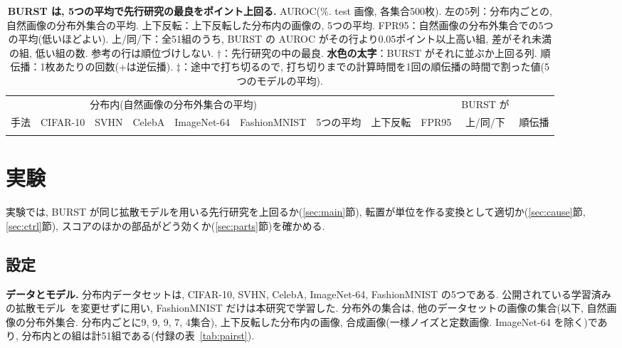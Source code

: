 \documentclass[MIRU,submit]{miru2025j}
\makeatletter
\newcommand{\method}{BURST}                 %
\renewenvironment{table*}{\@floatenv\capwidth\textwidth\ecapwidth\textwidth\abovecaptionskip\z@\belowcaptionskip1mm\@dblfloat{table}}{\end@dblfloat}
\makeatother
\begin{document}
\begin{table}[t]\centering\scriptsize\setlength{\tabcolsep}{3.2pt}\renewcommand{\arraystretch}{0.9}
\caption{\textbf{\method{} は, 5つの平均で先行研究の最良を\nGapPriorT{}ポイント上回る.} AUROC(\%. test 画像, 各集合500枚). 左の5列：分布内ごとの, 自然画像の分布外集合の平均. 上下反転：上下反転した分布内の画像の, 5つの平均. FPR95：自然画像の分布外集合での5つの平均(低いほどよい). 上/同/下：全51組のうち, \method{} の AUROC がその行より0.05ポイント以上高い組, 差がそれ未満の組, 低い組の数. 参考の行は順位づけしない. $\dagger$：先行研究の中の最良. \protect\colorbox{firstblue}{\textbf{水色の太字}}：\method{} がそれに並ぶか上回る列. 順伝播：1枚あたりの回数(+は逆伝播). $\ddagger$：途中で打ち切るので, 打ち切りまでの計算時間を1回の順伝播の時間で割った値(5つのモデルの平均).}
\label{tab:main}
\begin{adjustbox}{max width=\textwidth}\begin{tabular}{@{}lcccccccccc@{}}\toprule
& \multicolumn{5}{c}{分布内(自然画像の分布外集合の平均)} & & & & \method{} が & \\\cmidrule(lr){2-6}
手法 & CIFAR-10 & SVHN & CelebA & ImageNet-64 & FashionMNIST & 5つの平均 & 上下反転 & FPR95 & 上/同/下 & 順伝播\\\midrule
{}{tab_main.tex}
\end{tabular}\end{adjustbox}
\end{table}

\section{実験}
\label{sec:exp}
実験では, \method{} が同じ拡散モデルを用いる先行研究を上回るか(\ref{sec:main}節), 転置が単位を作る変換として適切か(\ref{sec:cause}節, \ref{sec:ctrl}節), スコアのほかの部品がどう効くか(\ref{sec:parts}節)を確かめる.

\subsection{設定}
\textbf{データとモデル.} 分布内データセットは, CIFAR-10, SVHN, CelebA, ImageNet-64, FashionMNIST の5つである. 公開されている学習済みの拡散モデル~\cite{karras2022edm,kamkari2024geometric,nichol2021improved,karras2024edm2}を変更せずに用い, FashionMNIST だけは本研究で学習した. 分布外の集合は, 他のデータセットの画像の集合(以下, 自然画像の分布外集合. 分布内ごとに9, 9, 9, 7, 4集合), 上下反転した分布内の画像, 合成画像(一様ノイズと定数画像. ImageNet-64 を除く)であり, 分布内との組は計51組である(付録の表~\ref{tab:pairst}).
\end{document}
